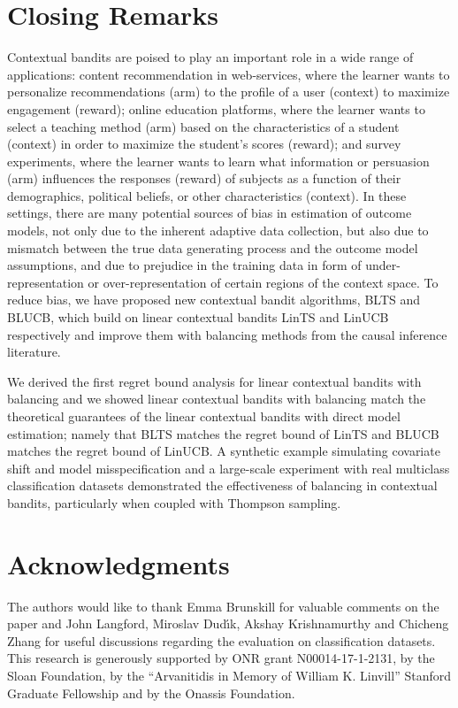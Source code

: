 \documentclass[letterpaper]{article} %
\begin{document}
\section{Closing Remarks}
Contextual bandits are poised to play an important role in a wide range of applications:
content recommendation in web-services, where the learner wants to personalize recommendations (arm) to the profile of a user (context) to maximize engagement (reward);  online education platforms, where the learner wants to select a teaching method (arm) based on the characteristics of a student (context) in order to maximize the student's scores (reward); and survey experiments, where the learner wants to learn what information or persuasion (arm) influences the responses (reward) of subjects as a function of their demographics, political beliefs, or other characteristics (context).
In these settings, there are many potential sources of bias in estimation of outcome models, not only due to the inherent adaptive data collection, but also due to mismatch between the true data generating process and the outcome model assumptions, and due to prejudice in the training data in form of under-representation or over-representation of certain regions of the context space.
To reduce bias, we have proposed new contextual bandit algorithms, BLTS and BLUCB, which build on linear contextual bandits LinTS and LinUCB respectively and improve them with balancing methods from the causal inference literature.

We derived the first regret bound analysis for linear contextual bandits with balancing and we showed linear contextual bandits with balancing match the theoretical guarantees of the linear contextual bandits with direct model estimation; namely that BLTS matches the regret bound of LinTS and BLUCB matches the regret bound of LinUCB.
A synthetic example simulating covariate shift and model misspecification and a large-scale experiment with real multiclass classification datasets demonstrated the effectiveness of balancing in contextual bandits, particularly when coupled with Thompson sampling.


\section{Acknowledgments}
The authors would like to thank Emma Brunskill for valuable comments on the paper and John Langford, Miroslav Dud{\'\i}k, Akshay Krishnamurthy and Chicheng Zhang for useful discussions regarding the evaluation on classification datasets.
This research is generously supported by ONR grant N00014-17-1-2131, by the Sloan Foundation, by the ``Arvanitidis in Memory of William K. Linvill'' Stanford Graduate Fellowship and by the Onassis Foundation.
\end{document}
